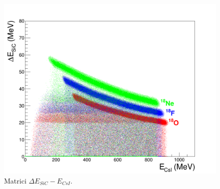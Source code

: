 \begin{figure} [!t]
	\centering
	\includegraphics[width=\textwidth, keepaspectratio]{Grafici_Tesi/Particelle_non_monocromatiche_Resid/deltaE_ERes.png}
	\caption{Matrici $\Delta E_{SiC} - E_{CsI}$.} \label{fig:deltaE_ERes}
\end{figure}






